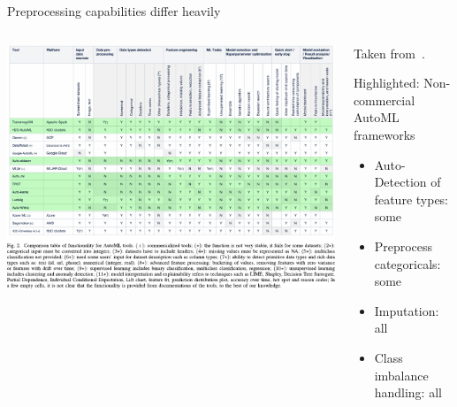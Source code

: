 \begin{frame}{Preprocessing capabilities differ heavily}
  \begin{columns}
    \begin{column}{0.6\textwidth}
      \vspace*{-1cm}
      \begin{center}
        \includegraphics[width = \linewidth]{images/Truong2019Towards_fig2.pdf}
      \end{center}
    \end{column}%
    \begin{column}{0.4\textwidth}
    \small
      Taken from~.
      \vspace{1em}

      Highlighted: Non-commercial AutoML frameworks

      \begin{itemize}
        \item Auto-Detection of feature types: some
        \item Preprocess categoricals: some
        \item Imputation: all
        \item Class imbalance handling: all
      \end{itemize}
    \end{column}
  \end{columns}
\end{frame}

